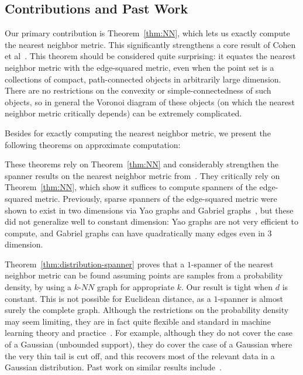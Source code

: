 \subsection{Contributions and Past Work}
Our primary contribution is Theorem~\ref{thm:NN}, which lets us exactly
compute the nearest neighbor metric. This significantly strengthens a core
result of Cohen et al~\cite{cohen15approximating}. This theorem should be considered
quite surprising: it equates the nearest neighbor metric with the
edge-squared metric, even when the point set is a collections of compact,
path-connected objects in arbitrarily large dimension. There are no
restrictions on the convexity or simple-connectedness of such objects, so
in general the Voronoi diagram of these objects (on which the nearest
neighbor metric critically depends) can be extremely complicated.

 Besides for exactly computing the nearest neighbor metric, we present the
following theorems on approximate computation:

 
These theorems rely on Theorem~\ref{thm:NN} and considerably strengthen the
spanner results on the nearest neighbor metric
from~\cite{cohen15approximating}. They critically rely on
Theorem~\ref{thm:NN}, which show it suffices to compute spanners of the
edge-squared metric.
Previously, sparse spanners of the edge-squared metric were shown to exist in two
dimensions via Yao graphs and Gabriel graphs~\cite{LiWan2001}, but these
did not generalize well to constant dimension: Yao
graphs are not very efficient to compute, and Gabriel graphs can have
quadratically many edges even in $3$ dimension.  

Theorem~\ref{thm:distribution-spanner} proves that a $1$-spanner of
the nearest neighbor metric can be found assuming points are samples from a
probability density, by using a $k$-$NN$ graph for
appropriate $k$. Our result is tight when $d$ is constant. This
is not possible for Euclidean distance, as a $1$-spanner is almost
surely the complete graph. Although the restrictions on the probability
density may seem limiting,
they are in fact quite flexible and standard in
machine learning theory and practice~\cite{alamgir12shortest, hwang2016}. For example, although they do not cover the case
of a Gaussian (unbounded support), they do cover the case of a Gaussian
where the very thin tail is cut off, and this recovers most of the relevant
data in a Gaussian distribution. Past work on similar results
include~\cite{Balister05, Gonzales2003}.

